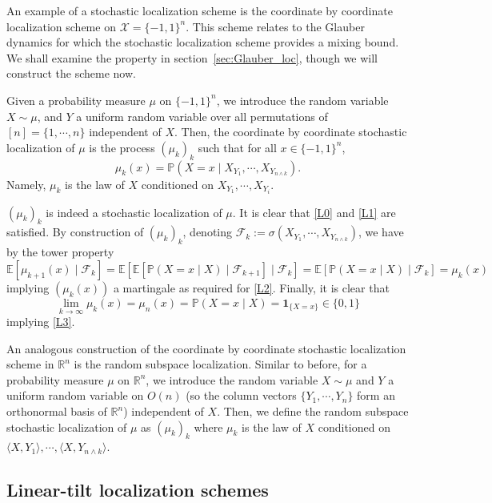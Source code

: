 An example of a stochastic localization scheme is the coordinate by coordinate localization scheme 
on \(\mathcal{X} = \{-1, 1\}^n\). This scheme relates to the Glauber dynamics for which the stochastic 
localization scheme provides a mixing bound. We shall examine the property in section~\ref{sec:Glauber_loc}, 
though we will construct the scheme now. 

Given a probability measure \(\mu\) on \(\{-1, 1\}^n\), we introduce the random variable \(X \sim \mu\), and 
\(Y\) a uniform random variable over all permutations of \([n] = \{1, \cdots, n\}\) independent of \(X\). 
Then, the coordinate by coordinate stochastic localization of \(\mu\) is the process \((\mu_k)_{k}\)
such that for all \(x \in \{-1, 1\}^n\),
\[\mu_k(x) = \mathbb{P}(X = x \mid X_{Y_1}, \cdots, X_{Y_{n \wedge k}}).\]
Namely, \(\mu_k\) is the law of \(X\) conditioned on \(X_{Y_1}, \cdots, X_{Y_i}\).

\((\mu_k)_{k}\) is indeed a stochastic localization of \(\mu\). It is clear that \ref{L0} and \ref{L1} are 
satisfied. By construction of \((\mu_k)_k\), denoting 
\(\mathscr{F}_k := \sigma(X_{Y_1}, \cdots, X_{Y_{n \wedge k}})\), we have by the tower property
\[\mathbb{E}[\mu_{k + 1}(x) \mid \mathscr{F}_k] 
  = \mathbb{E}[\mathbb{E}[\mathbb{P}(X = x \mid X) \mid \mathscr{F}_{k + 1}] \mid \mathscr{F}_k]
  = \mathbb{E}[\mathbb{P}(X = x \mid X) \mid \mathscr{F}_k] = \mu_k(x)\]
implying \((\mu_k(x))\) a martingale as required for \ref{L2}. Finally, it is clear that
\[\lim_{k \to \infty} \mu_k(x) = \mu_n(x) = \mathbb{P}(X = x \mid X) = \mathbf{1}_{\{X = x\}} \in \{0, 1\}\]
implying \ref{L3}.

An analogous construction of the coordinate by coordinate stochastic localization scheme in \(\mathbb{R}^n\) 
is the random subspace localization. Similar to before, for a probability measure \(\mu\) on \(\mathbb{R}^n\),
we introduce the random variable \(X \sim \mu\) and \(Y\) a uniform random variable on \(O(n)\) 
(so the column vectors \(\{Y_1, \cdots, Y_n\}\) form an orthonormal basis of \(\mathbb{R}^n\)) 
independent of \(X\). Then, we define the random subspace stochastic localization of \(\mu\) as \((\mu_k)_k\) 
where \(\mu_k\) is the law of \(X\) conditioned on \(\langle X, Y_1\rangle, \cdots, \langle X, Y_{n \wedge k}\rangle\).

\subsection{Linear-tilt localization schemes}

